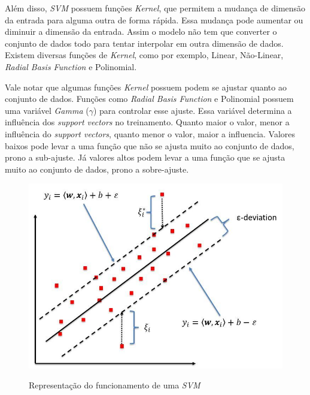 Além disso, \textit{\acrshort{SVM}} possuem funções \textit{Kernel}, que permitem a mudança de dimensão da entrada para alguma outra de forma rápida. Essa mudança pode aumentar ou diminuir a dimensão da entrada. Assim o modelo não tem que converter o conjunto de dados todo para tentar interpolar em outra dimensão de dados. Existem diversas funções de \textit{Kernel}, como por exemplo, Linear, Não-Linear, \textit{Radial Basis Function} e Polinomial.

Vale notar que algumas funções \textit{Kernel} possuem podem se ajustar quanto ao conjunto de dados. Funções como \textit{Radial Basis Function} e Polinomial possuem uma variável \textit{Gamma} (\(\gamma\)) para controlar esse ajuste. Essa variável determina a influência dos \textit{support vectors} no treinamento. Quanto maior o valor, menor a influência do \textit{support vectors}, quanto menor o valor, maior a influencia. Valores baixos pode levar a uma função que não se ajusta muito ao conjunto de dados, prono a sub-ajuste. Já valores altos podem levar a uma função que se ajusta muito ao conjunto de dados, prono a sobre-ajuste.

\begin{figure}[htbp]
    \centering
    \includegraphics[scale=1.0]{monography/img/svr_example.png}
    \label{figure:support_vector_machine}
    \caption[Representação do funcionamento de uma \textit{\acrshort{SVM}}]{Representação do funcionamento de uma \textit{\acrshort{SVM}}\footnotemark}
\end{figure}



